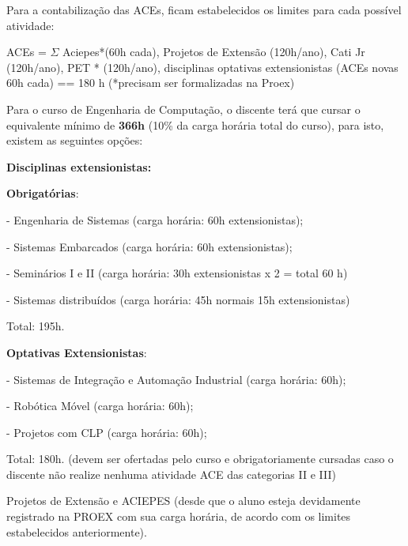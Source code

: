 Para a contabilização das ACEs, ficam estabelecidos os limites para cada possível atividade:

ACEs = $\Sigma $ Aciepes*(60h cada), Projetos de Extensão (120h/ano), Cati Jr (120h/ano), PET%
* (120h/ano), disciplinas optativas extensionistas (ACEs novas 60h cada) == 180 h  (*precisam ser formalizadas na Proex)


\bigskip

Para o curso de Engenharia de Computação, o discente terá que cursar o equivalente mínimo de \textbf{366h} (10\% da
carga horária total do curso), para isto, existem as seguintes opções: 


\bigskip

\textbf{Disciplinas extensionistas: }

\textbf{Obrigatórias}:

{}- Engenharia de Sistemas (carga horária: 60h extensionistas);

{}- Sistemas Embarcados (carga horária: 60h extensionistas);

{}- Seminários I e II (carga horária: 30h extensionistas x 2 = total 60 h)

{}- Sistemas distribuídos (carga horária: 45h normais 15h extensionistas)

Total: 195h.


\bigskip

\textbf{Optativas Extensionistas}:

{}- Sistemas de Integração e Automação Industrial (carga horária: 60h);

{}- Robótica Móvel (carga horária: 60h);

{}- Projetos com CLP (carga horária: 60h);


Total: 180h. (devem ser ofertadas pelo curso e obrigatoriamente cursadas caso o discente não realize nenhuma atividade
ACE das categorias II e III)


\bigskip





Projetos de Extensão e ACIEPES (desde que o aluno esteja devidamente registrado na PROEX com sua carga horária, de
acordo com os limites estabelecidos anteriormente).


